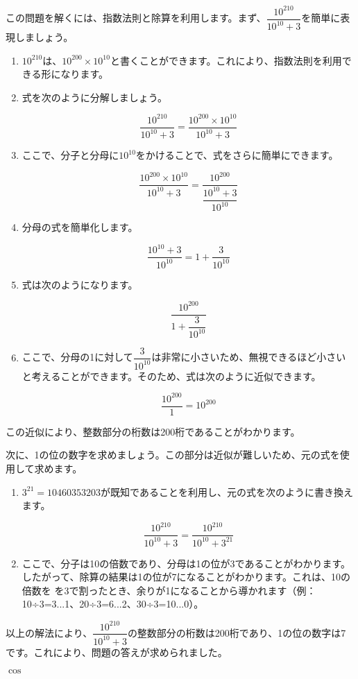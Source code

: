 \documentclass{jsarticle}
\title{}
\author{05215502 生物情報科学科 伊藤洸規}
\date{}
\begin{document}
\maketitle

\section*{}
この問題を解くには、指数法則と除算を利用します。まず、$\dfrac{10^{210}}{10^{10}+3}$を簡単に表現しましょう。

\begin{enumerate}
  \item $10^{210}$は、$10^{200} \times 10^{10}$と書くことができます。これにより、指数法則を利用できる形になります。
  \item 式を次のように分解しましょう。

  \[\dfrac{10^{210}}{10^{10}+3} = \dfrac{10^{200} \times 10^{10}}{10^{10}+3}\]

  \item ここで、分子と分母に$10^{10}$をかけることで、式をさらに簡単にできます。

  \[\dfrac{10^{200} \times 10^{10}}{10^{10}+3} = \dfrac{10^{200}}{\dfrac{10^{10}+3}{10^{10}}}\]

  \item 分母の式を簡単化します。

  \[\dfrac{10^{10}+3}{10^{10}} = 1 + \dfrac{3}{10^{10}}\]

  \item 式は次のようになります。

  \[\dfrac{10^{200}}{1+\dfrac{3}{10^{10}}}\]

  \item ここで、分母の1に対して$\dfrac{3}{10^{10}}$は非常に小さいため、無視できるほど小さいと考えることができます。そのため、式は次のように近似できます。

  \[\dfrac{10^{200}}{1} = 10^{200}\]

\end{enumerate}

この近似により、整数部分の桁数は200桁であることがわかります。

次に、1の位の数字を求めましょう。この部分は近似が難しいため、元の式を使用して求めます。

\begin{enumerate}
  \item $3^{21}=10460353203$が既知であることを利用し、元の式を次のように書き換えます。

  \[\dfrac{10^{210}}{10^{10}+3} = \dfrac{10^{210}}{10^{10}+3^{21}}\]

  \item ここで、分子は10の倍数であり、分母は1の位が3であることがわかります。したがって、除算の結果は1の位が7になることがわかります。これは、10の倍数を
  を3で割ったとき、余りが1になることから導かれます（例：10÷3=3...1、20÷3=6...2、30÷3=10...0）。
\end{enumerate}

以上の解法により、$\dfrac{10^{210}}{10^{10}+3}$の整数部分の桁数は200桁であり、1の位の数字は7です。これにより、問題の答えが求められました。


$\cos$
\end{document}
